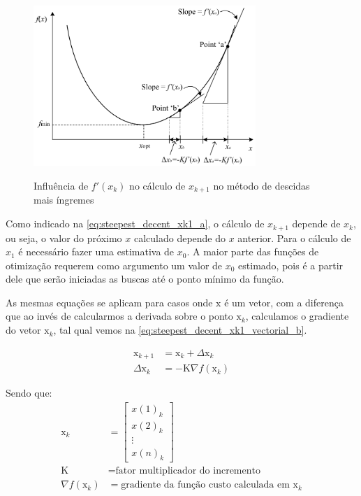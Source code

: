 \begin{figure}
	\caption{Influência de $f'(x_k)$ no cálculo de $x_{k+1}$ no método de descidas mais íngremes}
	\begin{center}
		\includegraphics[width=0.75\textwidth]{./5_images/fig_steepest_decent_slope.png} 
		\label{fig:steepest_decent_slope}
	\end{center}
	\centering
\end{figure}

Como indicado na \cref{eq:steepest_decent_xk1_a}, o cálculo de $x_{k+1}$ depende
de $x_k$, ou seja, o valor do próximo $x$ calculado depende do $x$ anterior. Para
o cálculo de $x_1$ é necessário fazer uma estimativa de $x_0$. A maior parte das
funções de otimização requerem como argumento um valor de $x_0$ estimado, pois é
a partir dele que serão iniciadas as buscas até o ponto mínimo da função.

As mesmas equações se aplicam para casos onde $\mathrm{x}$ é um vetor, com a diferença que
ao invés de calcularmos a derivada sobre o ponto $\mathrm{x}_k$, calculamos o gradiente
do vetor $\mathrm{x}_k$, tal qual vemos na \cref{eq:steepest_decent_xk1_vectorial_b}.

\begin{subequations}
	\begin{align}
		\mathrm{x}_{k+1} &= \mathrm{x}_k + \Delta \mathrm{x}_k			\label{eq:steepest_decent_xk1_vectorial_a} \\ 
		\Delta \mathrm{x}_k &= \mathrm{-K} \nabla f(\mathrm{x}_k)		\label{eq:steepest_decent_xk1_vectorial_b}
	\end{align}
\end{subequations}

\noindent
Sendo que: \\
\begin{align*}
	\mathrm{x}_k &= 					%
	\begin{bmatrix}
		x(1)_{k} \\
		x(2)_{k} \\
		\vdots \\
		x(n)_{k}
	\end{bmatrix} \\
	\mathrm{K} &= \text{fator multiplicador do incremento} \\
	\nabla f(\mathrm{x}_k) &= \text{gradiente da função custo calculada em } \mathrm{x}_k
\end{align*}
\newline

